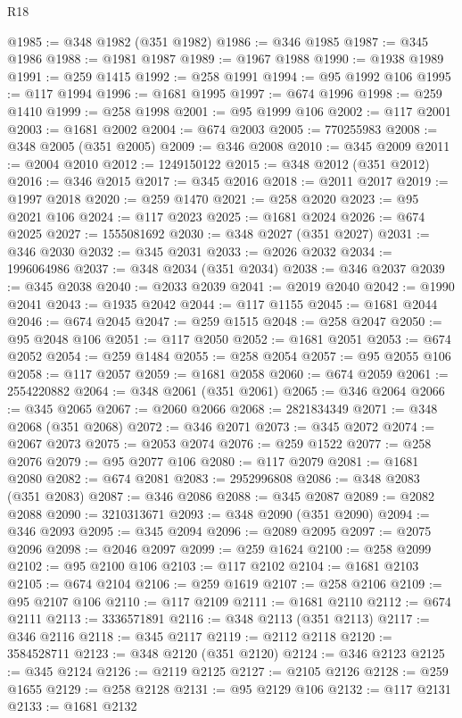 \begin{lexlean}{R18}
\begin{coremodule}
@1985 := @348 @1982 (@351 @1982)
@1986 := @346 @1985
@1987 := @345 @1986
@1988 := @1981 @1987
@1989 := @1967 @1988
@1990 := @1938 @1989
@1991 := @259 @1415
@1992 := @258 @1991
@1994 := @95 @1992 @106
@1995 := @117 @1994
@1996 := @1681 @1995
@1997 := @674 @1996
@1998 := @259 @1410
@1999 := @258 @1998
@2001 := @95 @1999 @106
@2002 := @117 @2001
@2003 := @1681 @2002
@2004 := @674 @2003
@2005 := 770255983
@2008 := @348 @2005 (@351 @2005)
@2009 := @346 @2008
@2010 := @345 @2009
@2011 := @2004 @2010
@2012 := 1249150122
@2015 := @348 @2012 (@351 @2012)
@2016 := @346 @2015
@2017 := @345 @2016
@2018 := @2011 @2017
@2019 := @1997 @2018
@2020 := @259 @1470
@2021 := @258 @2020
@2023 := @95 @2021 @106
@2024 := @117 @2023
@2025 := @1681 @2024
@2026 := @674 @2025
@2027 := 1555081692
@2030 := @348 @2027 (@351 @2027)
@2031 := @346 @2030
@2032 := @345 @2031
@2033 := @2026 @2032
@2034 := 1996064986
@2037 := @348 @2034 (@351 @2034)
@2038 := @346 @2037
@2039 := @345 @2038
@2040 := @2033 @2039
@2041 := @2019 @2040
@2042 := @1990 @2041
@2043 := @1935 @2042
@2044 := @117 @1155
@2045 := @1681 @2044
@2046 := @674 @2045
@2047 := @259 @1515
@2048 := @258 @2047
@2050 := @95 @2048 @106
@2051 := @117 @2050
@2052 := @1681 @2051
@2053 := @674 @2052
@2054 := @259 @1484
@2055 := @258 @2054
@2057 := @95 @2055 @106
@2058 := @117 @2057
@2059 := @1681 @2058
@2060 := @674 @2059
@2061 := 2554220882
@2064 := @348 @2061 (@351 @2061)
@2065 := @346 @2064
@2066 := @345 @2065
@2067 := @2060 @2066
@2068 := 2821834349
@2071 := @348 @2068 (@351 @2068)
@2072 := @346 @2071
@2073 := @345 @2072
@2074 := @2067 @2073
@2075 := @2053 @2074
@2076 := @259 @1522
@2077 := @258 @2076
@2079 := @95 @2077 @106
@2080 := @117 @2079
@2081 := @1681 @2080
@2082 := @674 @2081
@2083 := 2952996808
@2086 := @348 @2083 (@351 @2083)
@2087 := @346 @2086
@2088 := @345 @2087
@2089 := @2082 @2088
@2090 := 3210313671
@2093 := @348 @2090 (@351 @2090)
@2094 := @346 @2093
@2095 := @345 @2094
@2096 := @2089 @2095
@2097 := @2075 @2096
@2098 := @2046 @2097
@2099 := @259 @1624
@2100 := @258 @2099
@2102 := @95 @2100 @106
@2103 := @117 @2102
@2104 := @1681 @2103
@2105 := @674 @2104
@2106 := @259 @1619
@2107 := @258 @2106
@2109 := @95 @2107 @106
@2110 := @117 @2109
@2111 := @1681 @2110
@2112 := @674 @2111
@2113 := 3336571891
@2116 := @348 @2113 (@351 @2113)
@2117 := @346 @2116
@2118 := @345 @2117
@2119 := @2112 @2118
@2120 := 3584528711
@2123 := @348 @2120 (@351 @2120)
@2124 := @346 @2123
@2125 := @345 @2124
@2126 := @2119 @2125
@2127 := @2105 @2126
@2128 := @259 @1655
@2129 := @258 @2128
@2131 := @95 @2129 @106
@2132 := @117 @2131
@2133 := @1681 @2132

\end{coremodule}
\end{lexlean}
